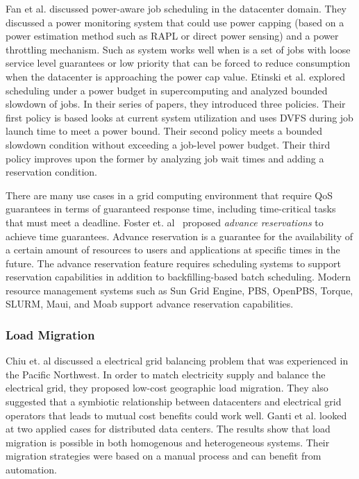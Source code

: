 Fan et al. \cite{PowerAwareServer1} discussed power-aware job scheduling in the
datacenter domain. They discussed a power monitoring system that could use
power capping (based on a power estimation method such as RAPL or direct power
sensing) and a power throttling mechanism. Such as system works well when is a
set of jobs with loose service level guarantees or low priority that can be
forced to reduce consumption when the datacenter is approaching the power cap
value. Etinski et al. \cite{Etinski1,Etinski2,Etinski3,Etinski4} explored
scheduling under a power budget in supercomputing and analyzed bounded slowdown
of jobs. In their series of papers, they introduced three policies. Their first
policy is based looks at current system utilization and uses DVFS during job
launch time to meet a power bound. Their second policy meets a bounded slowdown
condition without exceeding a job-level power budget. Their third policy
improves upon the former by analyzing job wait times and adding a reservation
condition. 

There are many use cases in a grid computing environment that require QoS
guarantees in terms of guaranteed response time, including time-critical tasks
that must meet a deadline. Foster et. al~\cite{foster_distributed_1999,foster_anatomy_2001} proposed \emph{advance
reservations} to achieve time guarantees. Advance reservation is a guarantee for
the availability of a certain amount of resources to users and applications at
specific times in the future. The advance reservation feature requires
scheduling systems to support reservation capabilities in addition to
backfilling-based batch scheduling. Modern resource management systems such as
Sun Grid Engine, PBS, OpenPBS, Torque, SLURM, Maui, and Moab support advance
reservation capabilities.

\subsubsection{Load Migration}
Chiu et. al \cite{chiu_electric_2012} discussed a electrical grid balancing
problem that was experienced in the Pacific Northwest. In order to match
electricity supply and balance the electrical grid, they proposed low-cost
geographic load migration. They also suggested that a symbiotic relationship
between datacenters and electrical grid operators that leads to mutual cost
benefits could work well. Ganti et al. \cite{Ghatikar2012b} looked at two
applied cases for distributed data centers. The results show that load migration
is possible in both homogenous and heterogeneous systems. Their migration
strategies were based on a manual process and can benefit from automation.

